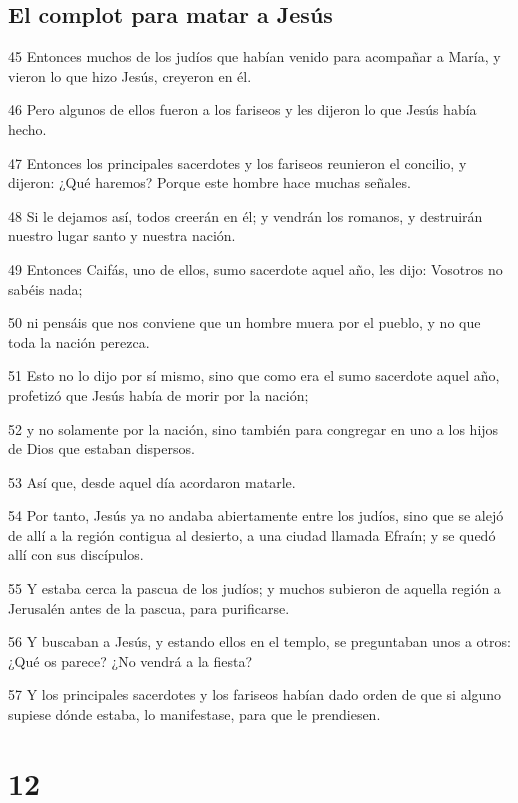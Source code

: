 \section*{El complot para matar a Jesús}

\par 45 Entonces muchos de los judíos que habían venido para acompañar a María, y vieron lo que hizo Jesús, creyeron en él.
\par 46 Pero algunos de ellos fueron a los fariseos y les dijeron lo que Jesús había hecho.
\par 47 Entonces los principales sacerdotes y los fariseos reunieron el concilio, y dijeron: ¿Qué haremos? Porque este hombre hace muchas señales.
\par 48 Si le dejamos así, todos creerán en él; y vendrán los romanos, y destruirán nuestro lugar santo y nuestra nación.
\par 49 Entonces Caifás, uno de ellos, sumo sacerdote aquel año, les dijo: Vosotros no sabéis nada;
\par 50 ni pensáis que nos conviene que un hombre muera por el pueblo, y no que toda la nación perezca.
\par 51 Esto no lo dijo por sí mismo, sino que como era el sumo sacerdote aquel año, profetizó que Jesús había de morir por la nación;
\par 52 y no solamente por la nación, sino también para congregar en uno a los hijos de Dios que estaban dispersos.
\par 53 Así que, desde aquel día acordaron matarle.
\par 54 Por tanto, Jesús ya no andaba abiertamente entre los judíos, sino que se alejó de allí a la región contigua al desierto, a una ciudad llamada Efraín; y se quedó allí con sus discípulos.
\par 55 Y estaba cerca la pascua de los judíos; y muchos subieron de aquella región a Jerusalén antes de la pascua, para purificarse.
\par 56 Y buscaban a Jesús, y estando ellos en el templo, se preguntaban unos a otros: ¿Qué os parece? ¿No vendrá a la fiesta?
\par 57 Y los principales sacerdotes y los fariseos habían dado orden de que si alguno supiese dónde estaba, lo manifestase, para que le prendiesen.

\chapter{12}

